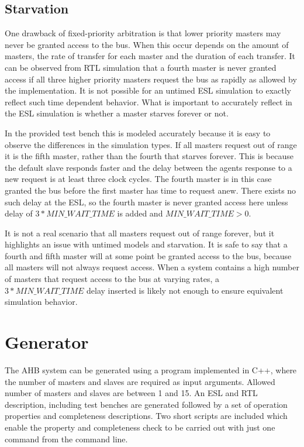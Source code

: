\subsection{Starvation}
One drawback of fixed-priority arbitration is that lower priority masters may never be granted access to the bus. When this occur depends on the amount of masters, the rate of transfer for each master and the duration of each transfer. It can be observed from RTL simulation that a fourth master is never granted access if all three higher priority masters request the bus as rapidly as allowed by
the implementation. It is not possible for an untimed ESL simulation to exactly reflect such time dependent behavior. What is important to accurately reflect in the ESL simulation is whether a master starves forever or not. \par
In the provided test bench this is modeled accurately because it is easy to observe the differences in the simulation types. If all masters request out of range it is the fifth master, rather than the fourth that starves forever. This is because the default slave responds faster and the delay between the agents response to a new request is at least three clock cycles. The fourth master is in this case granted the bus before the first master has time to request anew. There exists no such delay at the ESL, so the fourth master is never granted access here unless delay of $3*MIN\_WAIT\_TIME$ is added and $MIN\_WAIT\_TIME>0$. \par
It is not a real scenario that all masters request out of range forever, but it highlights an issue with untimed models and starvation. It is safe to say that a fourth and fifth master will at some point be granted access to the bus, because all masters will not always request access. When a system contains a high number of masters that request access to the bus at varying rates, a $3*MIN\_WAIT\_TIME$ delay inserted is likely not enough to ensure equivalent simulation behavior. 

\section{Generator}
\label{sec:generator}
The AHB system can be generated using a program implemented in C++, where the number of masters and slaves are required as input arguments. Allowed number of
masters and slaves are between 1 and 15. An ESL and RTL description, including test benches are generated followed by a set of operation properties and completeness descriptions. Two short scripts are included which enable the property and completeness check to be carried out with just one command from the
command line. 

